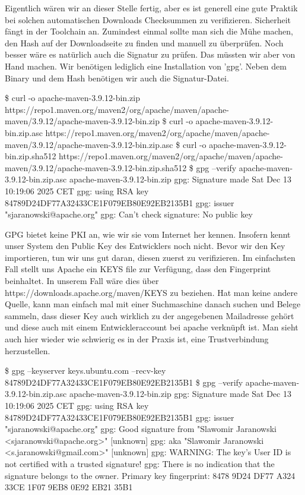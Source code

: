 Eigentlich wären wir an dieser Stelle fertig, aber es ist 
generell eine gute Praktik bei solchen automatischen Downloads 
Checksummen zu verifizieren. Sicherheit fängt in der Toolchain an. Zumindest
einmal sollte man sich die Mühe machen, den Hash auf der Downloadseite zu 
finden und manuell zu überprüfen. Noch besser wäre es natürlich auch 
die Signatur zu prüfen. Das müssten wir aber von Hand machen. Wir benötigen
lediglich eine Installation von 'gpg'. Neben dem Binary und dem Hash benötigen
wir auch die Signatur-Datei.

\begin{terminalbox}
\begin{VerbatimBreak}
\$ curl -o apache-maven-3.9.12-bin.zip https://repo1.maven.org/maven2/org/apache/maven/apache-maven/3.9.12/apache-maven-3.9.12-bin.zip
\$ curl -o apache-maven-3.9.12-bin.zip.asc https://repo1.maven.org/maven2/org/apache/maven/apache-maven/3.9.12/apache-maven-3.9.12-bin.zip.asc
\$ curl -o apache-maven-3.9.12-bin.zip.sha512 https://repo1.maven.org/maven2/org/apache/maven/apache-maven/3.9.12/apache-maven-3.9.12-bin.zip.sha512
\$ gpg --verify apache-maven-3.9.12-bin.zip.asc apache-maven-3.9.12-bin.zip
gpg: Signature made Sat Dec 13 10:19:06 2025 CET
gpg:                using RSA key 84789D24DF77A32433CE1F079EB80E92EB2135B1
gpg:                issuer "sjaranowski@apache.org"
gpg: Can't check signature: No public key
\end{VerbatimBreak}
\end{terminalbox}

GPG bietet keine PKI an, wie wir sie vom Internet her kennen. 
Insofern kennt unser System den
Public Key des Entwicklers noch nicht. Bevor wir den Key importieren, tun wir 
uns gut daran, diesen zuerst zu verifizieren. Im einfachsten Fall stellt uns Apache
ein KEYS file zur Verfügung, dass den Fingerprint beinhaltet. In unserem Fall
wäre dies über https://downloads.apache.org/maven/KEYS zu beziehen. Hat man keine 
andere Quelle, kann man einfach mal
mit einer Suchmaschine danach suchen und Belege sammeln, dass dieser Key auch
wirklich zu der angegebenen Mailadresse gehört und diese auch mit einem
Entwickleraccount bei apache verknüpft ist. 
Man sieht auch hier wieder wie schwierig es in der Praxis ist, eine
Trustverbindung herzustellen.

\begin{terminalbox}
\begin{VerbatimBreak}
\$ gpg --keyserver keys.ubuntu.com --recv-key 84789D24DF77A32433CE1F079EB80E92EB2135B1
\$ gpg --verify apache-maven-3.9.12-bin.zip.asc apache-maven-3.9.12-bin.zip
gpg: Signature made Sat Dec 13 10:19:06 2025 CET
gpg:                using RSA key 84789D24DF77A32433CE1F079EB80E92EB2135B1
gpg:                issuer "sjaranowski@apache.org"
gpg: Good signature from "Slawomir Jaranowski <sjaranowski@apache.org>" [unknown]
gpg:                 aka "Slawomir Jaranowski <s.jaranowski@gmail.com>" [unknown]
gpg: WARNING: The key's User ID is not certified with a trusted signature!
gpg:          There is no indication that the signature belongs to the owner.
Primary key fingerprint: 8478 9D24 DF77 A324 33CE  1F07 9EB8 0E92 EB21 35B1
\end{VerbatimBreak}
\end{terminalbox}

